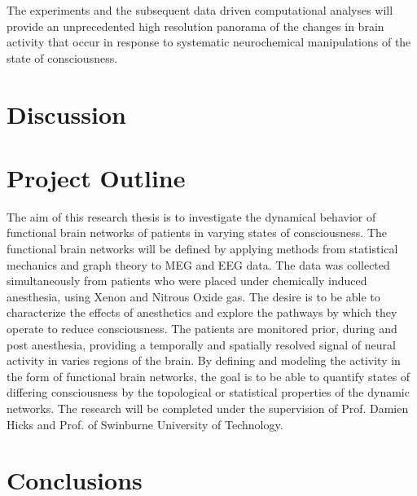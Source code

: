\documentclass{article}
\begin{document}
The experiments and the subsequent data driven computational analyses will provide an  unprecedented high resolution panorama of the changes in brain activity that occur in response to systematic neurochemical manipulations of the state of consciousness.
\section{Discussion}

\section{Project Outline}
The aim of this research thesis is to investigate the dynamical behavior of functional brain networks of patients in varying states of consciousness. The functional brain networks will be defined by applying methods from statistical mechanics and graph theory to MEG and EEG data. The data was collected simultaneously from patients who were placed under chemically induced anesthesia, using Xenon and Nitrous Oxide gas. The desire is to be able to characterize the effects of anesthetics and explore the pathways by which they operate to reduce consciousness. The patients are monitored prior, during and post anesthesia, providing a temporally and spatially resolved signal of neural  activity in varies regions of the brain. By defining and modeling the activity in the form of functional brain networks, the goal is to be able to quantify states of differing consciousness by the topological or statistical properties of the dynamic networks. The research will be completed under the supervision of Prof. Damien Hicks and Prof. of Swinburne University of Technology.

\section{Conclusions}


\cite{zart}

\nocite{*}


\end{document}
